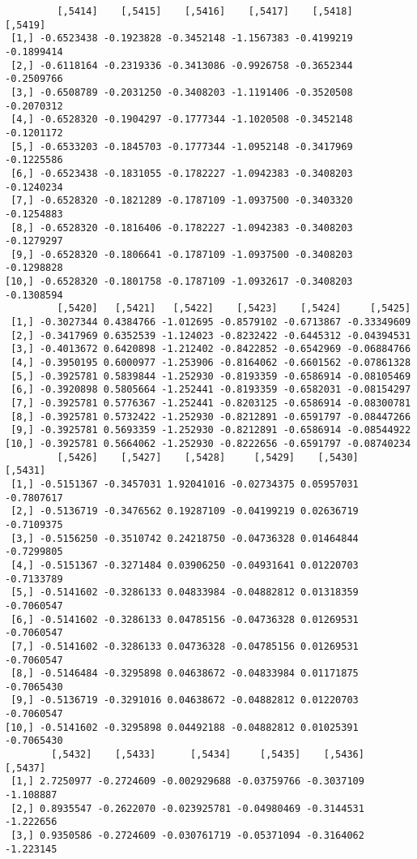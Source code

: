 \documentclass[
  letterpaper,
  DIV=11,
  numbers=noendperiod]{scrreprt}
\begin{document}
\begin{verbatim}
         [,5414]    [,5415]    [,5416]    [,5417]    [,5418]    [,5419]
 [1,] -0.6523438 -0.1923828 -0.3452148 -1.1567383 -0.4199219 -0.1899414
 [2,] -0.6118164 -0.2319336 -0.3413086 -0.9926758 -0.3652344 -0.2509766
 [3,] -0.6508789 -0.2031250 -0.3408203 -1.1191406 -0.3520508 -0.2070312
 [4,] -0.6528320 -0.1904297 -0.1777344 -1.1020508 -0.3452148 -0.1201172
 [5,] -0.6533203 -0.1845703 -0.1777344 -1.0952148 -0.3417969 -0.1225586
 [6,] -0.6523438 -0.1831055 -0.1782227 -1.0942383 -0.3408203 -0.1240234
 [7,] -0.6528320 -0.1821289 -0.1787109 -1.0937500 -0.3403320 -0.1254883
 [8,] -0.6528320 -0.1816406 -0.1782227 -1.0942383 -0.3408203 -0.1279297
 [9,] -0.6528320 -0.1806641 -0.1787109 -1.0937500 -0.3408203 -0.1298828
[10,] -0.6528320 -0.1801758 -0.1787109 -1.0932617 -0.3408203 -0.1308594
         [,5420]   [,5421]   [,5422]    [,5423]    [,5424]     [,5425]
 [1,] -0.3027344 0.4384766 -1.012695 -0.8579102 -0.6713867 -0.33349609
 [2,] -0.3417969 0.6352539 -1.124023 -0.8232422 -0.6445312 -0.04394531
 [3,] -0.4013672 0.6420898 -1.212402 -0.8422852 -0.6542969 -0.06884766
 [4,] -0.3950195 0.6000977 -1.253906 -0.8164062 -0.6601562 -0.07861328
 [5,] -0.3925781 0.5839844 -1.252930 -0.8193359 -0.6586914 -0.08105469
 [6,] -0.3920898 0.5805664 -1.252441 -0.8193359 -0.6582031 -0.08154297
 [7,] -0.3925781 0.5776367 -1.252441 -0.8203125 -0.6586914 -0.08300781
 [8,] -0.3925781 0.5732422 -1.252930 -0.8212891 -0.6591797 -0.08447266
 [9,] -0.3925781 0.5693359 -1.252930 -0.8212891 -0.6586914 -0.08544922
[10,] -0.3925781 0.5664062 -1.252930 -0.8222656 -0.6591797 -0.08740234
         [,5426]    [,5427]    [,5428]     [,5429]    [,5430]    [,5431]
 [1,] -0.5151367 -0.3457031 1.92041016 -0.02734375 0.05957031 -0.7807617
 [2,] -0.5136719 -0.3476562 0.19287109 -0.04199219 0.02636719 -0.7109375
 [3,] -0.5156250 -0.3510742 0.24218750 -0.04736328 0.01464844 -0.7299805
 [4,] -0.5151367 -0.3271484 0.03906250 -0.04931641 0.01220703 -0.7133789
 [5,] -0.5141602 -0.3286133 0.04833984 -0.04882812 0.01318359 -0.7060547
 [6,] -0.5141602 -0.3286133 0.04785156 -0.04736328 0.01269531 -0.7060547
 [7,] -0.5141602 -0.3286133 0.04736328 -0.04785156 0.01269531 -0.7060547
 [8,] -0.5146484 -0.3295898 0.04638672 -0.04833984 0.01171875 -0.7065430
 [9,] -0.5136719 -0.3291016 0.04638672 -0.04882812 0.01220703 -0.7060547
[10,] -0.5141602 -0.3295898 0.04492188 -0.04882812 0.01025391 -0.7065430
        [,5432]    [,5433]      [,5434]     [,5435]    [,5436]   [,5437]
 [1,] 2.7250977 -0.2724609 -0.002929688 -0.03759766 -0.3037109 -1.108887
 [2,] 0.8935547 -0.2622070 -0.023925781 -0.04980469 -0.3144531 -1.222656
 [3,] 0.9350586 -0.2724609 -0.030761719 -0.05371094 -0.3164062 -1.223145

\end{verbatim}
\end{document}
